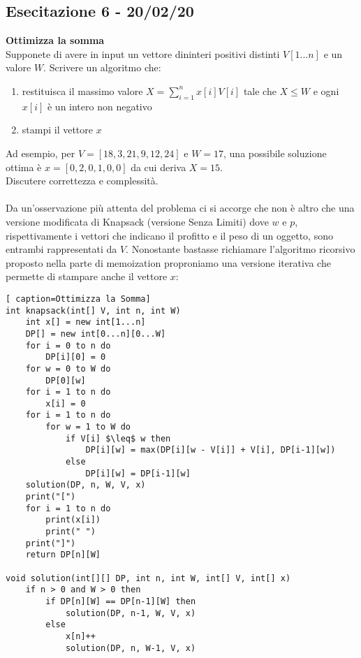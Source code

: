 \documentclass[../cheatSheetAlgoritmi.tex]{subfiles}
\begin{document}
\subsection{Esecitazione 6 - 20/02/20}
\textbf{Ottimizza la somma}\\
Supponete di avere in input un vettore dininteri positivi distinti $V[1. . . n]$ e un valore $W$. Scrivere un algoritmo che:
\begin{enumerate}
	\item restituisca il massimo valore $X =  \sum_{i = 1}^{n} x[i] V[i]$ tale che $X \leq W$ e ogni $x[i]$ è un intero non negativo
	\item stampi il vettore $x$
\end{enumerate}
Ad esempio, per $V = [18,3,21,9,12,24]$ e $W = 17$, una possibile soluzione ottima è $x = [0,2,0,1,0,0]$ da cui deriva $X= 15$.\\
Discutere correttezza e complessità.\\\\
Da un'osservazione più attenta del problema ci si accorge che non è altro che una versione modificata di Knapsack (versione Senza Limiti) dove $w$ e $p$, rispettivamente i vettori che indicano il profitto e il peso di un oggetto, sono entrambi rappresentati da $V$. Nonostante bastasse richiamare l'algoritmo ricorsivo proposto nella parte di memoization proproniamo una versione iterativa che permette di stampare anche il vettore $x$:\\
\begin{lstlisting}[ caption=Ottimizza la Somma]
int knapsack(int[] V, int n, int W)
	int x[] = new int[1...n]
	DP[] = new int[0...n][0...W]
	for i = 0 to n do
		DP[i][0] = 0
	for w = 0 to W do
		DP[0][w]
	for i = 1 to n do
		x[i] = 0
	for i = 1 to n do
		for w = 1 to W do
			if V[i] $\leq$ w then
				DP[i][w] = max(DP[i][w - V[i]] + V[i], DP[i-1][w])
			else
				DP[i][w] = DP[i-1][w]
	solution(DP, n, W, V, x)
	print("[")
	for i = 1 to n do
		print(x[i])
		print(" ")
	print("]")
	return DP[n][W]
	
void solution(int[][] DP, int n, int W, int[] V, int[] x)
	if n > 0 and W > 0 then
		if DP[n][W] == DP[n-1][W] then
			solution(DP, n-1, W, V, x)
		else
			x[n]++
			solution(DP, n, W-1, V, x)
\end{lstlisting}
\end{document}
